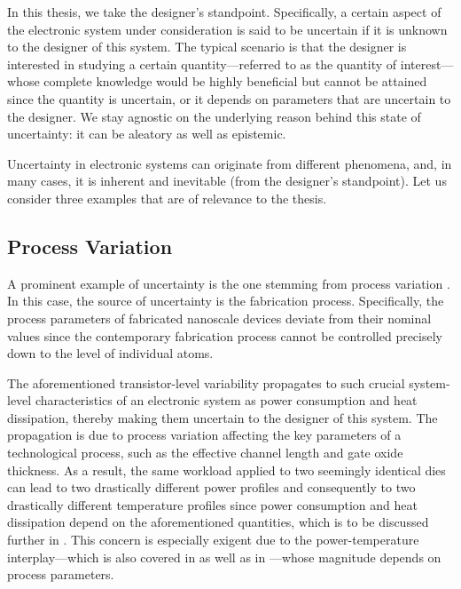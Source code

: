 In this thesis, we take the designer's standpoint. Specifically, a certain
aspect of the electronic system under consideration is said to be uncertain if
it is unknown to the designer of this system. The typical scenario is that the
designer is interested in studying a certain quantity---referred to as the
quantity of interest---whose complete knowledge would be highly beneficial but
cannot be attained since the quantity \perse is uncertain, or it depends on
parameters that are uncertain to the designer. We stay agnostic on the
underlying reason behind this state of uncertainty: it can be aleatory as well
as epistemic.

Uncertainty in electronic systems can originate from different phenomena, and,
in many cases, it is inherent and inevitable (from the designer's standpoint).
Let us consider three examples that are of relevance to the thesis.

\subsection{Process Variation}

A prominent example of uncertainty is the one stemming from process variation
\cite{chandrakasan2000, srivastava2010}. In this case, the source of uncertainty
is the fabrication process. Specifically, the process parameters of fabricated
nanoscale devices deviate from their nominal values since the contemporary
fabrication process cannot be controlled precisely down to the level of
individual atoms.

The aforementioned transistor-level variability propagates to such crucial
system-level characteristics of an electronic system as power consumption and
heat dissipation, thereby making them uncertain to the designer of this system.
The propagation is due to process variation affecting the key parameters of a
technological process, such as the effective channel length and gate oxide
thickness. As a result, the same workload applied to two seemingly identical
dies can lead to two drastically different power profiles and consequently to
two drastically different temperature profiles since power consumption and heat
dissipation depend on the aforementioned quantities, which is to be discussed
further in . This concern is especially exigent due to the
power-temperature interplay---which is also covered in  as
well as in ---whose magnitude depends on process
parameters.


